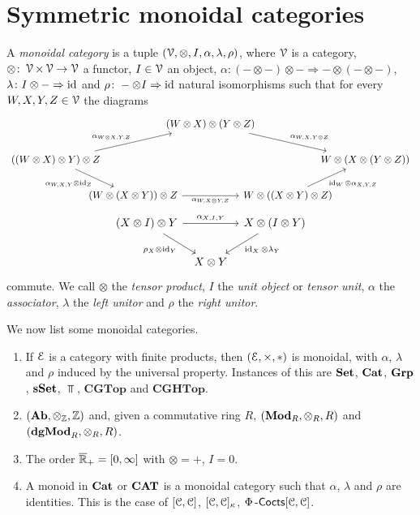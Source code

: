 \documentclass[a4paper,11pt,oneside,openany]{scrbook}
\begin{document}
\section{Symmetric monoidal categories}

\begin{defn}
	A \emph{monoidal category} is a tuple $(\operatorname{\mathcal{V}},\otimes,I,\alpha,\lambda,\rho)$, where $\operatorname{\mathcal{V}}$ is a category, $\otimes\colon\operatorname{\mathcal{V}}\times\operatorname{\mathcal{V}}\rightarrow\operatorname{\mathcal{V}}$ a functor, $I\in\operatorname{\mathcal{V}}$ an object, $\alpha\colon(-\otimes-)\otimes-\Rightarrow-\otimes(-\otimes-)$, $\lambda\colon I\otimes-\Rightarrow\operatorname{id}$ and $\rho\colon-\otimes I\Rightarrow\operatorname{id}$ natural isomorphisms such that for every $W,X,Y,Z\in\operatorname{\mathcal{V}}$ the diagrams
	\[
		\begin{tikzcd}[column sep = -2.0em]
			& & (W \otimes X) \otimes (Y \otimes Z) \arrow[drr, "\alpha_{W, X, Y \otimes Z}"] \\
			((W \otimes X) \otimes Y) \otimes Z \arrow[urr, "\alpha_{W \otimes X, Y, Z}"] \arrow[dr,"\alpha_{W,X,Y} \otimes \id_Z", swap]
			& & & & W \otimes (X \otimes (Y \otimes Z)) \\
			& (W \otimes (X \otimes Y)) \otimes Z \arrow[rr, "\alpha_{W, X \otimes Y, Z}", swap]
			& & W \otimes ((X \otimes Y) \otimes Z) \arrow[ur, "\id_{W}\otimes\alpha_{X,Y,Z}", swap]
		\end{tikzcd}
	\]
	\[
		\begin{tikzcd}[column sep=tiny]
			(X\otimes I)\otimes Y\ar[rr, "\alpha_{X,I,Y}"]\ar[dr, "\rho_X\otimes\id_Y", swap]
			&& X\otimes (I\otimes Y)\ar[dl, "\id_X\otimes\lambda_Y"] \\
			& X\otimes Y
		\end{tikzcd}
	\]
	commute. We call $\otimes$ the \emph{tensor product}, $I$ the \emph{unit object} or \emph{tensor unit}, $\alpha$ the \emph{associator}, $\lambda$ the \emph{left unitor} and $\rho$ the \emph{right unitor}.
\end{defn}

\begin{exmp}
	We now list some monoidal categories.
	\begin{enumerate}
		\item If $\operatorname{\mathcal{E}}$ is a category with finite products, then $(\operatorname{\mathcal{E}},\times,*)$ is monoidal, with $\alpha$, $\lambda$ and $\rho$ induced by the universal property. Instances of this are ${\normalfont\textbf{Set}}$, ${\normalfont\textbf{Cat}}$, ${\normalfont\textbf{Grp}}$, ${\normalfont\textbf{sSet}}$, $\Top$, $\mathbf{CGTop}$ and $\mathbf{CGHTop}$.
		\item $({\normalfont\textbf{Ab}},\otimes_{\operatorname{\mathbb{Z}}},\operatorname{\mathbb{Z}})$ and, given a commutative ring $R$, $({\normalfont\textbf{Mod}}_R,\otimes_R,R)$ and $({\normalfont\textbf{dgMod}}_R,\otimes_R,R)$.
		\item The order $\overline{\operatorname{\mathbb{R}}}_+=[0,\infty]$ with $\otimes=+$, $I=0$.
		\item A monoid in ${\normalfont\textbf{Cat}}$ or ${\normalfont\textbf{CAT}}$ is a monoidal category such that $\alpha$, $\lambda$ and $\rho$ are identities. This is the case of $[\operatorname{\mathcal{C}},\operatorname{\mathcal{C}}]$, $[\operatorname{\mathcal{C}},\operatorname{\mathcal{C}}]_\kappa$, $\Phi\operatorname{-\mathsf{Cocts}}[\operatorname{\mathcal{C}},\operatorname{\mathcal{C}}]$.
	\end{enumerate}
\end{exmp}
\end{document}
